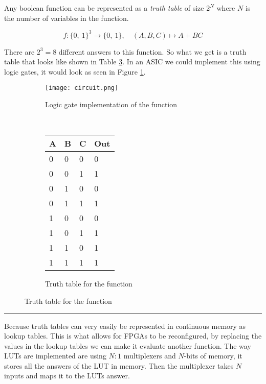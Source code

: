 \begin{example}
    Any boolean function can be represented as a \textit{truth table} of size $2^N$
    where $N$ is the number of variables in the function.

    \[
    f \colon \{0,\ 1\}^3 \rightarrow \{0,\ 1\}, \quad (A, B, C) \mapsto A + BC
    \]

    There are $2^3 = 8$ different answers to this function. So what we get is
    a truth table that looks like shown in Table \ref{tab:example_truth_table}.
    In an ASIC we could implement this using logic gates, it would look as seen
    in Figure \ref{fig:logic_gate_impl}.

\begin{figure}
    \begin{subfigure}[b]{.4\textwidth}
    \centering
        \texttt{[image: circuit.png]}
        \caption{Logic gate implementation of the function}
        \label{fig:logic_gate_impl}
    \end{subfigure}
    ~
    \begin{subfigure}[b]{.4\textwidth}
    \centering
        \begin{tabular}{|l|l|l|l|}
            \hline
            A & B & C & Out \\ \hline
            0 & 0 & 0 & 0   \\ \hline
            0 & 0 & 1 & 1   \\ \hline
            0 & 1 & 0 & 0   \\ \hline
            0 & 1 & 1 & 1   \\ \hline
            1 & 0 & 0 & 0   \\ \hline
            1 & 0 & 1 & 1   \\ \hline
            1 & 1 & 0 & 1   \\ \hline
            1 & 1 & 1 & 1   \\ \hline
        \end{tabular}
        \caption{Truth table for the function}
        \label{tab:example_truth_table}
    \end{subfigure}
\end{figure}

\end{example}

\hrule

Because truth tables can very easily be represented in continuous memory as
lookup tables. This is what allows for FPGAs to be reconfigured, by replacing
the values in the lookup tables we can make it evaluate another function. The
way LUTs are implemented are using $N:1$ multiplexers and $N$-bits of memory,
it stores all the answers of the LUT in memory. Then the multiplexer takes $N$
inputs and maps it to the LUTs answer.

